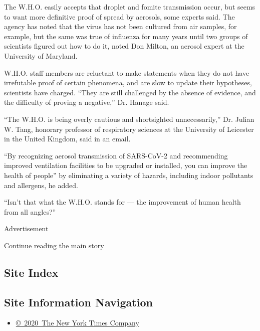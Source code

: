 The W.H.O. easily accepts that droplet and fomite transmission occur,
but seems to want more definitive proof of spread by aerosols, some
experts said. The agency has noted that the virus has not been cultured
from air samples, for example, but the same was true of influenza for
many years until two groups of scientists figured out how to do it,
noted Don Milton, an aerosol expert at the University of Maryland.

W.H.O. staff members are reluctant to make statements when they do not
have irrefutable proof of certain phenomena, and are slow to update
their hypotheses, scientists have charged. ``They are still challenged
by the absence of evidence, and the difficulty of proving a negative,''
Dr. Hanage said.

``The W.H.O. is being overly cautious and shortsighted unnecessarily,''
Dr. Julian W. Tang, honorary professor of respiratory sciences at the
University of Leicester in the United Kingdom, said in an email.

``By recognizing aerosol transmission of SARS-CoV-2 and recommending
improved ventilation facilities to be upgraded or installed, you can
improve the health of people'' by eliminating a variety of hazards,
including indoor pollutants and allergens, he added.

``Isn't that what the W.H.O. stands for --- the improvement of human
health from all angles?''

Advertisement

\protect\hyperlink{after-bottom}{Continue reading the main story}

\hypertarget{site-index}{%
\subsection{Site Index}\label{site-index}}

\hypertarget{site-information-navigation}{%
\subsection{Site Information
Navigation}\label{site-information-navigation}}

\begin{itemize}
\tightlist
\item
  \href{https://help.nytimes.com/hc/en-us/articles/115014792127-Copyright-notice}{©~2020~The
  New York Times Company}
\end{itemize}

